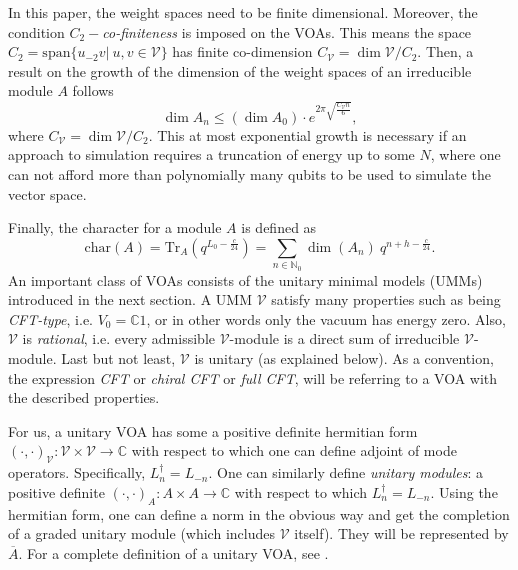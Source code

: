 \documentclass[twoside,11pt,titlepage]{amsart}
\renewcommand{\=}[1]{\stackrel{#1}{=}} %
\theoremstyle{definition}
\theoremstyle{remark}
\begin{document}
In this paper, the weight spaces need to be finite dimensional. Moreover, the condition $C_2-$\textit{co-finiteness} is imposed on the VOAs. This means the space $C_2=\text{span} \{u_{-2}v| \ u,v \in \mathcal{V}\}$ has finite co-dimension $C_\mathcal{V}=\dim \mathcal{V}/C_{2}$. Then, a result \cite[(27)]{konig2017matrix} on the growth of the dimension of the weight spaces of an irreducible module $A$ follows
$$\dim A_n \le (\dim A_0) \cdot e^{2\pi\sqrt{\frac{C_\mathcal{V}n}{6}}},$$
where $C_\mathcal{V}=\dim \mathcal{V}/C_2$. This at most exponential growth is necessary if an approach to simulation requires a truncation of energy up to some $N$, where one can not afford more than polynomially many qubits to be used to simulate the vector space.

Finally, the character for a module $A$ is defined as
$$\text{char}(A)=\text{Tr}_A(q^{L_0-\frac{c}{24}})=\sum_{n \in \mathbb{N}_0} \dim(A_{n})\  q^{n+h-\frac{c}{24}}.$$
An important class of VOAs consists of the unitary minimal models (UMMs) introduced in the next section. A UMM $\mathcal{V}$ satisfy many properties such as being \textit{CFT-type}, i.e. $V_0=\mathbb{C}1$, or in other words only the vacuum has energy zero. Also, $\mathcal{V}$ is \textit{rational}, i.e. every admissible $\mathcal{V}$-module is a direct sum of irreducible $\mathcal{V}$-module. Last but not least, $\mathcal{V}$ is unitary (as explained below). As a convention, the expression \textit{CFT} or \textit{chiral CFT} or \textit{full CFT}, will be referring to a VOA with the described properties.

For us, a unitary VOA has some a positive definite hermitian form $(\cdot,\cdot)_\mathcal{V}:\mathcal{V} \times \mathcal{V} \to \mathbb{C}$ with respect to which one can define adjoint of mode operators. Specifically, $L_n^\dagger=L_{-n}$. One can similarly define \textit{unitary modules}: a positive definite $(\cdot,\cdot)_A: A\times A \to \mathbb{C}$ with respect to which $L_n^\dagger=L_{-n}$. Using the hermitian form, one can define a norm in the obvious way and get the completion of a graded unitary module (which includes $\mathcal{V}$ itself). They will be represented by $\overline{A}$. For a complete definition of a unitary VOA, see \cite{konig2017matrix}.
\end{document}
